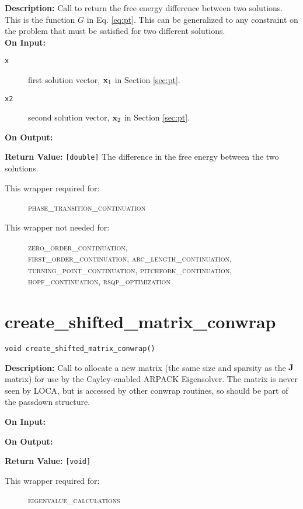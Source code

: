 {\bf Description:}   Call to return the free energy difference between two solutions. This is the function $G$ in Eq. \ref{eq:pt}. This can be generalized to any constraint on the problem that must be satisfied for two different solutions. \\

{\bf On Input:}
\begin{description}
\item[\texttt{x}] first solution vector, ${\bf x}_1$ in Section \ref{sec:pt}.
\item[\texttt{x2}] second solution vector, ${\bf x}_2$ in Section \ref{sec:pt}.
\end{description}

{\bf On Output:}

{\bf Return Value:} \texttt{[double]}  The difference in the free energy between the two solutions.
\begin{description}
\item[This wrapper required for:]
\textsc{phase\_transition\_continuation}
\item[This wrapper not needed for:]
\textsc{zero\_order\_continuation,\\
first\_order\_continuation, arc\_length\_continuation, \\
turning\_point\_continuation, pitchfork\_continuation, \\
hopf\_continuation, rsqp\_optimization}
\end{description}

\section{create\_shifted\_matrix\_conwrap}

\texttt{void create\_shifted\_matrix\_conwrap()}

{\bf Description:}  Call to allocate a new matrix (the same size and sparsity 
as the ${\bf J}$ matrix) for use by the Cayley-enabled ARPACK Eigensolver. The
matrix is never seen by LOCA, but is accessed by other conwrap routines, so 
should be part of the passdown structure.

{\bf On Input:}

{\bf On Output:}

{\bf Return Value:} \texttt{[void]} 

\begin{description}
\item[This wrapper required for:]
\textsc{eigenvalue\_calculations}
\end{description}

